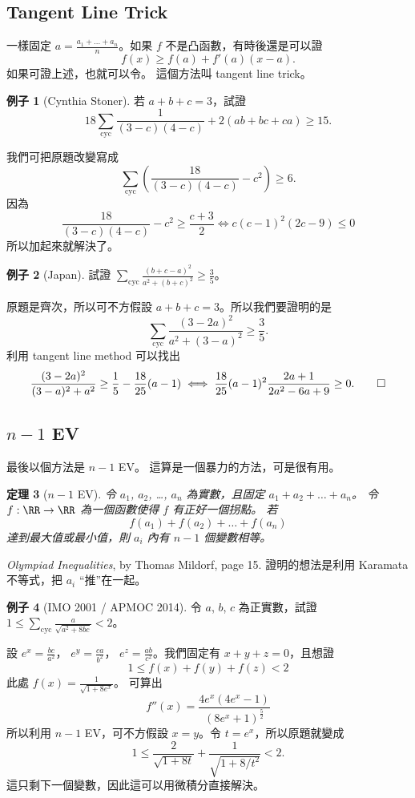 \documentclass[11pt,nothm]{scrartcl}
\newtheorem{theorem}{\color{blue!40!black}定理}
\theoremstyle{definition}
\newtheorem{example}[theorem]{\color{blue!40!black}例子}
\let\oldendproof\endproof
\renewenvironment{proof}[1][【證】]{%
  \oldproof[\bfseries #1\nopunct]%
}{\oldendproof}
\begin{document}
\subsection{Tangent Line Trick}
一樣固定 $a = \frac{a_1 + \dots + a_n}{n}$。如果 $f$ 不是凸函數，有時後還是可以證
\[ f(x) \ge f(a) + f'(a) \left( x-a \right). \]
如果可證上述，也就可以令。 這個方法叫 tangent line trick。

\begin{example}
  [Cynthia Stoner] 若 $a+b+c=3$，試證 \[ 18\sum_{\text{cyc}}\frac{1}{(3-c)(4-c)}+2(ab+bc+ca)\ge 15. \]
\end{example}
\begin{proof}
  我們可把原題改變寫成
  \[ \sum_{\text{cyc}} \left( \frac{18}{(3-c)(4-c)} - c^2 \right) \ge 6. \]
  因為
  \[ \frac{18}{(3-c)(4-c)} -c^2 \ge \frac{c+3}{2}\iff c(c-1)^2(2c-9)\le 0 \]
  所以加起來就解決了。
\end{proof}
\begin{example}
  [Japan] 試證 $\sum_{\text{cyc}} \frac{(b+c-a)^2}{a^2+(b+c)^2} \ge \frac 35$。
\end{example}
\begin{proof}
  原題是齊次，所以可不方假設 $a+b+c=3$。所以我們要證明的是
  \[ \sum_{\text{cyc}} \frac{(3-2a)^2}{a^2+(3-a)^2} \ge \frac 35. \]
  利用 tangent line method 可以找出
  \[
    \frac{(3-2a)^{2}}{(3-a)^{2}+a^{2}}\ge\frac{1}{5} - \frac{18}{25}(a-1)
    \iff
    \frac{18}{25}(a-1)^{2}\frac{2a+1}{2a^{2}-6a+9}
    \ge 0. \qedhere \]
\end{proof}

\subsection{$n-1$ EV}
最後以個方法是 $n-1$ EV。
這算是一個暴力的方法，可是很有用。
\begin{theorem}
  [$n-1$ EV] 令 $a_1$, $a_2$, \dots, $a_n$ 為實數，且固定 $a_1 + a_2 + \dots + a_n$。
  令 $f : \RR \to \RR$ 為一個函數使得 $f$ 有正好一個拐點。
  若
  \[ f(a_1) + f(a_2) + \dots + f(a_n) \]
  達到最大值或最小值，則 $a_i$ 內有 $n-1$ 個變數相等。
\end{theorem}
\begin{proof}
  \emph{Olympiad Inequalities}, by Thomas Mildorf, page 15.
  證明的想法是利用 Karamata 不等式，把 $a_i$ “推”在一起。
\end{proof}

\begin{example}
  [IMO 2001 / APMOC 2014] 令 $a$, $b$, $c$ 為正實數，試證
  $ 1 \le \sum_{\text{cyc}} \frac{a}{\sqrt{a^2+8bc}} < 2 $。
\end{example}
\begin{proof}
  設 $e^x = \frac{bc}{a^2}$， $e^y = \frac{ca}{b^2}$， $e^z = \frac{ab}{c^2}$。我們固定有 $x+y+z=0$，且想證
  \[ 1 \le f(x) + f(y) + f(z) < 2 \]
  此處 $f(x) = \frac{1}{\sqrt{1+8e^x}}$。 可算出
  \[ f''(x) = \frac{4e^x \left( 4e^x-1 \right)}{(8e^x+1)^{\frac52}} \]
  所以利用 $n-1$ EV，可不方假設 $x=y$。令 $t=e^x$，所以原題就變成
  \[ 1 \le \frac{2}{\sqrt{1+8t}} + \frac{1}{\sqrt{1+8/t^2}} < 2. \]
  這只剩下一個變數，因此這可以用微積分直接解決。
\end{proof}
\end{document}
